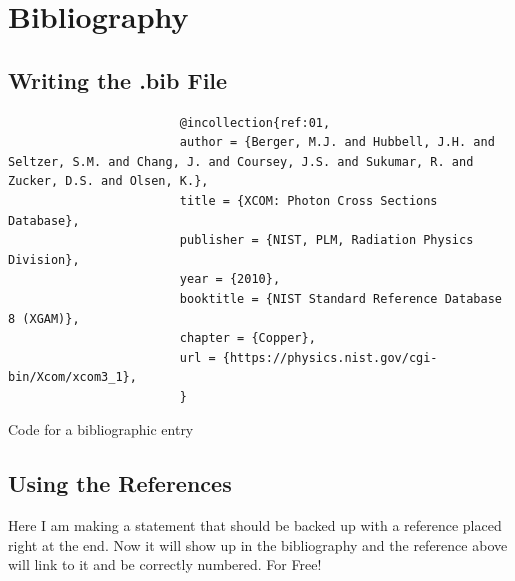\documentclass[hidelinks, 12pt]{article}%
\begin{document}
    \section{Bibliography}
        \subsection{Writing the .bib File}

            \begin{listing}[H]
                \begin{centering}
                    \begin{verbatim}
                        @incollection{ref:01,
                        author = {Berger, M.J. and Hubbell, J.H. and Seltzer, S.M. and Chang, J. and Coursey, J.S. and Sukumar, R. and Zucker, D.S. and Olsen, K.},
                        title = {XCOM: Photon Cross Sections Database},
                        publisher = {NIST, PLM, Radiation Physics Division},
                        year = {2010},
                        booktitle = {NIST Standard Reference Database 8 (XGAM)},
                        chapter = {Copper},
                        url = {https://physics.nist.gov/cgi-bin/Xcom/xcom3_1},
                        }
                    \end{verbatim}
                    \caption{Code for a bibliographic entry}
                    \label{lst:bibliography}
                \end{centering}
            \end{listing}
        \subsection{Using the References}
            Here I am making a statement that should be backed up with a reference placed right at the end. \cite{ref:01}
            Now it will show up in the bibliography and the reference above will link to it and be
            correctly numbered. For Free!

    \clearpage
    \printbibliography[heading=bibintoc]
\end{document}
